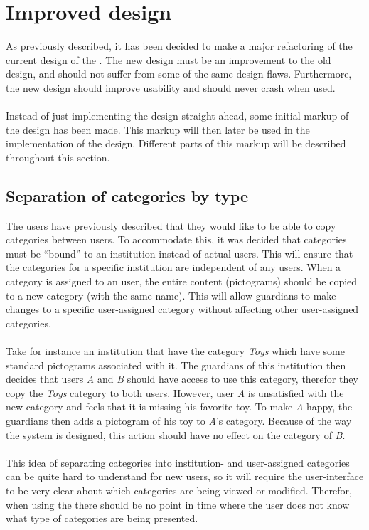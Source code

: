 \section{Improved design}
\label{sec:improved_design}

As previously described, it has been decided to make a major refactoring of the current design of the \ct. The new design must be an improvement to the old design, and should not suffer from some of the same design flaws. Furthermore, the new design should improve usability and should never crash when used.
\\\\
Instead of just implementing the design straight ahead, some initial markup of the design has been made. This markup will then later be used in the implementation of the design. Different parts of this markup will be described throughout this section.

\subsection{Separation of categories by type}
The users have previously described that they would like to be able to copy categories between users. To accommodate this, it was decided that categories must  be ``bound'' to an institution instead of actual users. This will ensure that the categories for a specific institution are independent of any users. When a category is assigned to an user, the entire content (pictograms) should be copied to a new category (with the same name). This will allow guardians to make changes to a specific user-assigned category without affecting other user-assigned categories. 
\\\\
Take for instance an institution that have the category \emph{Toys} which have some standard pictograms associated with it. The guardians of this institution then decides that users \emph{A} and \emph{B} should have access to use this category, therefor they copy the \emph{Toys} category to both users. However, user \emph{A} is unsatisfied with the new category and feels that it is missing his favorite toy. To make \emph{A} happy, the guardians then adds a pictogram of his toy to \emph{A}'s category. Because of the way the system is designed, this action should have no effect on the category of \emph{B}.
\\\\
This idea of separating categories into institution- and user-assigned categories can be quite hard to understand for new users, so it will require the user-interface to be very clear about which categories are being viewed or modified. Therefor, when using the \ct there should be no point in time where the user does not know what type of categories are being presented. 


